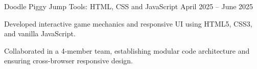 \resumeProject
    {Doodle Piggy Jump}
    {Tools: HTML, CSS and JavaScript}
    {April 2025 -- June 2025}
    {{} }
    \resumeItemListStart
      \item Developed interactive game mechanics and responsive UI using HTML5, CSS3, and vanilla JavaScript.
      \item Collaborated in a 4-member team, establishing modular code architecture and ensuring cross-browser responsive design.
    \resumeItemListEnd